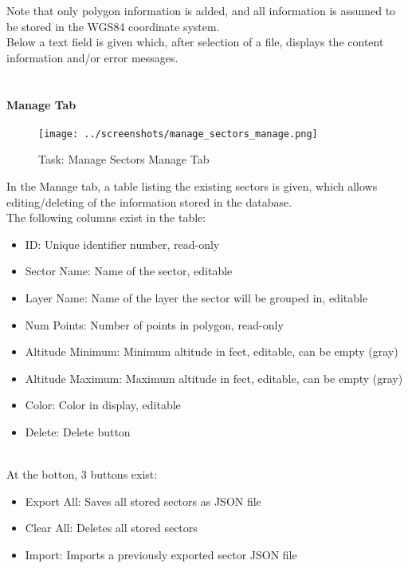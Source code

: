 Note that only polygon information is added, and all information is assumed to be stored in the WGS84 coordinate system. \\

Below a text field is given which, after selection of a file, displays the content information and/or error messages. \\\

\paragraph {Manage Tab}

\begin{figure}[H]
    \texttt{[image: ../screenshots/manage\_sectors\_manage.png]}
  \caption{Task: Manage Sectors Manage Tab}
\end{figure}

In the Manage tab, a table listing the existing sectors is given, which allows editing/deleting of the information stored in the database. \\

The following columns exist in the table:
\begin{itemize}  
\item ID: Unique identifier number, read-only
\item Sector Name: Name of the sector, editable
\item Layer Name: Name of the layer the sector will be grouped in, editable
\item Num Points: Number of points in polygon, read-only
\item Altitude Minimum: Minimum altitude in feet, editable, can be empty (gray)
\item Altitude Maximum: Maximum altitude in feet, editable, can be empty (gray)
\item Color: Color in display, editable
\item Delete: Delete button
\end{itemize}
\ \\

At the botton, 3 buttons exist:

\begin{itemize}  
\item Export All: Saves all stored sectors as JSON file
\item Clear All: Deletes all stored sectors
\item Import: Imports a previously exported sector JSON file
\end{itemize}
\ \\

